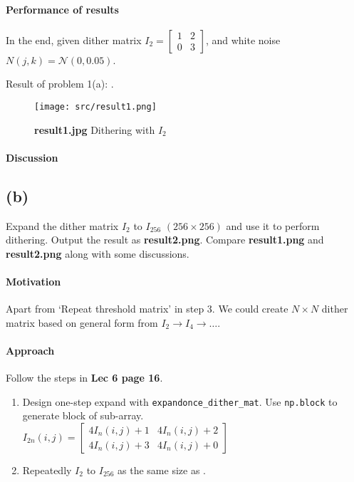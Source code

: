 \paragraph{Performance of results}
In the end, given dither matrix 
\(
I_{2} = 
\begin{bmatrix}
    1 & 2\\
    0 & 3
\end{bmatrix}
\), and white noise \(N(j, k) = \mathcal{N}(0, 0.05)\).

Result of problem 1(a): .
\begin{figure}
    \centering
    \texttt{[image: src/result1.png]}
    \caption{\textbf{result1.jpg} Dithering with \(I_{2}\)}
    \label{result1}
\end{figure}

\paragraph{Discussion}

\subsection{(b)}\label{1_b}
Expand the dither matrix \(I_{2}\) to \(I_{256}\) \((256 \times 256)\) and use it to perform dithering. Output the result as \textbf{result2.png}. Compare \textbf{result1.png} and \textbf{result2.png} along with some discussions.

\paragraph{Motivation}
Apart from `Repeat threshold matrix' in step 3. We could create \(N \times N\) dither matrix based on general form from \(I_{2} \rightarrow I_{4} \rightarrow \dots\).

\paragraph{Approach}
Follow the steps in \textbf{Lec 6 page 16}.
\begin{enumerate}
    \item Design one-step expand with \texttt{expandonce\_dither\_mat}. Use \texttt{np.block} to generate block of sub-array. \\
	\(
	I_{2n}(i, j) = 
	\begin{bmatrix}
	    4 I_{n}(i, j) + 1 & 4 I_{n}(i, j) + 2\\
	    4 I_{n}(i, j) + 3 & 4 I_{n}(i, j) + 0
	\end{bmatrix}
	\)
    \item Repeatedly \(I_{2}\) to \(I_{256}\) as the same size as .
\end{enumerate}

